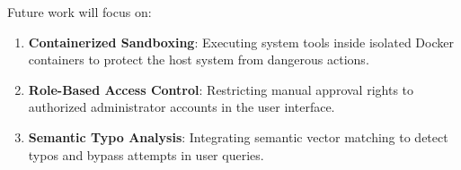 \documentclass{article}
\begin{document}
Future work will focus on:
\begin{enumerate}
    \item \textbf{Containerized Sandboxing}: Executing system tools inside isolated Docker containers to protect the host system from dangerous actions.
    \item \textbf{Role-Based Access Control}: Restricting manual approval rights to authorized administrator accounts in the user interface.
    \item \textbf{Semantic Typo Analysis}: Integrating semantic vector matching to detect typos and bypass attempts in user queries.
\end{enumerate}
\end{document}

